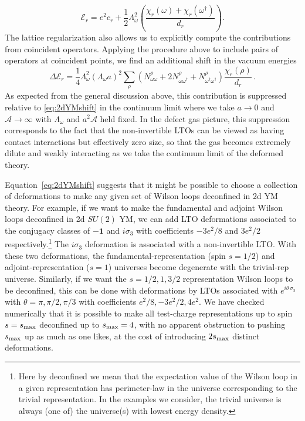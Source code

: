 \documentclass[11pt]{article}
\def\tfrac#1#2{{\textstyle{\frac{#1}{#2}}}}
\begin{document}
\begin{equation} \label{eq:2dYMshift}
    \mathcal E_r  = e^2c_{r} + \tfrac{1}{2}\Lambda_\omega^2 \left(\frac{\chi_r(\omega) + \chi_r(\omega^\dagger)}{d_{r}}\right).
\end{equation}
The lattice regularization also allows us to explicitly compute the contributions from coincident operators. Applying the procedure above to include pairs of operators at coincident points, we find an additional shift in the vacuum energies
\begin{equation}
\Delta \mathcal E_r = \tfrac{1}{4}\Lambda_\omega^2(\Lambda_\omega a)^2\sum_{\rho}\left(N_{\omega\omega}^\rho + 2N_{\omega\omega^\dagger}^\rho + N_{\omega^\dagger\omega^\dagger}^\rho\right)\frac{\chi_r(\rho)}{d_{r}}\,. 
\end{equation}
As expected from the general discussion above, this contribution is suppressed relative to \eqref{eq:2dYMshift} in the continuum limit where we take $a\to0$ and $\mathcal A \to \infty$ with $\Lambda_\omega$ and $a^2\mathcal A$ held fixed. In the defect gas picture, this suppression corresponds to the fact that the non-invertible LTOs can be viewed as having contact interactions but effectively zero size, so that the gas becomes extremely dilute and weakly interacting as we take the continuum limit of the deformed theory. 

Equation~\eqref{eq:2dYMshift} suggests that it might be possible to choose a collection of deformations to make any given set of Wilson loops deconfined in 2d YM theory. For example, if we want to make the fundamental and adjoint Wilson loops deconfined in 2d $SU(2)$ YM, we can add LTO deformations associated to the conjugacy classes of $-\mathbf{1}$ and $i\sigma_3$ with coefficients $-3e^2/8$ and $3e^2/2$ respectively.\footnote{Here by deconfined we mean that the expectation value of the Wilson loop in a given representation has perimeter-law in the universe corresponding to the trivial representation. In the examples we consider, the trivial universe is always (one of) the universe(s) with lowest energy density.} The  $i\sigma_3$ deformation is associated with a non-invertible LTO.  With these two deformations, the fundamental-representation (spin $s=1/2$) and adjoint-representation ($s=1$) universes become degenerate with the trivial-rep universe. Similarly, if we want the $s=1/2, 1, 3/2$ representation Wilson loops to be deconfined, this can be done with deformations by LTOs associated with $e^{i\theta\,\sigma_3}$ with $\theta = \pi, \pi/2,\pi/3$ with coefficients $e^2/8, -3 e^2/2, 4 e^2$. We have checked numerically that it is possible to make all test-charge representations up to spin $s = s_{\rm max}$ deconfined up to $s_{\rm max} = 4$, with no apparent obstruction to pushing $s_{\rm max}$ up as much as one likes, at the cost of introducing $2 s_{\rm max}$ distinct deformations.
\end{document}
